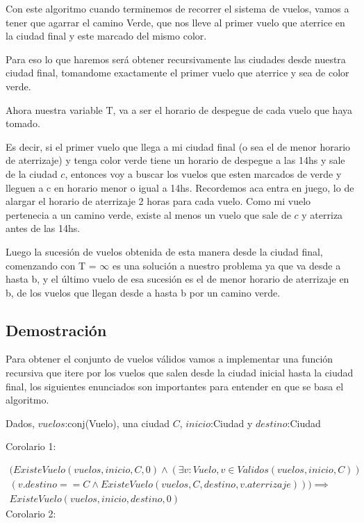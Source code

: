 Con este algoritmo cuando terminemos de recorrer el sistema de vuelos, vamos a tener que agarrar el camino Verde, que nos lleve al primer vuelo que aterrice en la ciudad final y este marcado del mismo color.

Para eso lo que haremos ser\'a obtener recursivamente las ciudades desde nuestra ciudad final, tomandome exactamente el primer vuelo que aterrice y sea de color verde.

Ahora nuestra variable T, va a ser el horario de despegue de cada vuelo que haya tomado. 

Es decir, si el primer vuelo que llega a mi ciudad final (o sea el de menor horario de aterrizaje) y tenga color verde tiene un horario de despegue a las 14hs y sale de la ciudad $c$, entonces voy a buscar los vuelos que esten marcados de verde y lleguen a c en horario menor o igual a 14hs. Recordemos aca entra en juego, lo de alargar el horario de aterrizaje 2 horas para cada vuelo.
Como mi vuelo pertenecia a un camino verde, existe al menos un vuelo que sale de $c$ y aterriza antes de las 14hs.

Luego la sucesi\'on de vuelos obtenida de esta manera desde la ciudad final, comenzando con T = $\infty$ es una soluci\'on a nuestro problema ya que va desde a hasta b, y el \'ultimo vuelo de esa sucesi\'on es el de menor horario de aterrizaje en b, de los vuelos que llegan desde a hasta b por un camino verde.

\newpage

\subsection{Demostración}
Para obtener el conjunto de vuelos v\'alidos vamos a implementar una funci\'on recursiva que itere por los vuelos que salen desde la ciudad inicial hasta la ciudad final, los siguientes enunciados son importantes para entender en que se basa el algoritmo.

Dados, $vuelos$:conj(Vuelo), una ciudad $C$, $inicio$:Ciudad y $destino$:Ciudad

Corolario 1:

\begin{align*}
(ExisteVuelo(vuelos,inicio, C, 0) \wedge (\exists v:Vuelo, v \in Validos(vuelos,inicio,C))\\
(v.destino == C \wedge ExisteVuelo(vuelos,C, destino, v.aterrizaje))) \implies \\ ExisteVuelo(vuelos,inicio, destino, 0)
\end{align*}
Corolario 2:

